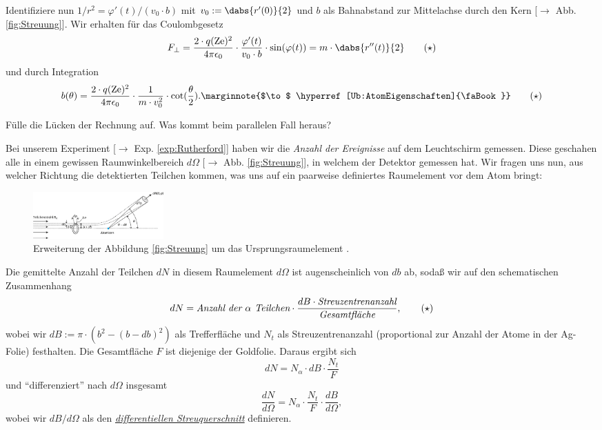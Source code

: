 \documentclass{subfiles}
\begin{document}
        Identifiziere nun $1/r^2=\varphi'(t)/(v_0\cdot b)$ mit $v_0:=\dabs{r'(0)}{2}$ und $b$ als Bahnabstand zur Mittelachse durch den Kern [$\to$ Abb. \ref{fig:Streuung}]. Wir erhalten für das Coulombgesetz 
        \begin{align*}
            F_\perp=\frac{2\cdot q(\text{Ze})^2}{4\pi\epsilon_0}\cdot\frac{\varphi'(t)}{v_0\cdot b}\cdot\sin(\varphi(t))=m\cdot\dabs{r''(t)}{2}
            \label{Ub:OrthKraftRutherford}\tag{$\star$}
        \end{align*}
        und durch Integration 
        \begin{align*}
            b(\theta)=\frac{2\cdot q(\text{Ze})^2}{4\pi\epsilon_0}\cdot\frac{1}{m\cdot v_0^2}\cdot\cot(\frac{\theta}{2}).
            \label{Ub:StreuungBahnabstand}\marginnote{$\to$ \hyperref[Ub:AtomEigenschaften]{\faBook}}\tag{$\star$}
        \end{align*}
        \begin{Aufgabe}
            \nr{} Fülle die Lücken der Rechnung auf. Was kommt beim parallelen Fall heraus?
        \end{Aufgabe}
        Bei unserem Experiment [$\to$ Exp. \ref{exp:Rutherford}] haben wir die \emph{Anzahl der Ereignisse} auf dem Leuchtschirm gemessen. Diese geschahen alle in einem gewissen Raumwinkelbereich $d\Omega$ [$\to$ Abb. \ref{fig:Streuung}], in welchem der Detektor gemessen hat. Wir fragen uns nun, aus welcher Richtung die detektierten Teilchen kommen, was uns auf ein paarweise definiertes Raumelement vor dem Atom bringt: 
        \begin{figure}
            \centering
            \includegraphics[width=5cm]{Bilddateien/physiko.21.45_9783110445671-fig_002.jpg}
            \caption[short]{Erweiterung der Abbildung \ref{fig:Streuung} um das Ursprungsraumelement \cite{degruyer:Streuung}.}
            \label{fig:StreuungRaumelemente}
        \end{figure}
        Die gemittelte Anzahl der Teilchen $dN$ in diesem Raumelement $d\Omega$ ist augenscheinlich von $db$ ab, sodaß wir auf den schematischen Zusammenhang 
        \begin{align*}
            dN = \emph{Anzahl der }\alpha\emph{ Teilchen}\cdot\frac{dB\cdot \emph{Streuzentrenanzahl}}{\emph{Gesamtfläche}},\label{Ub:dNRutherford}\tag{$\star$}
        \end{align*}
        wobei wir $dB:=\pi\cdot(b^2-(b-db)^2)$ als Trefferfläche und $N_t$ als Streuzentrenanzahl (proportional zur Anzahl der Atome in der Ag-Folie) festhalten. Die Gesamtfläche $F$ ist diejenige der Goldfolie. Daraus ergibt sich
        \[dN = N_\alpha \cdot dB \cdot\frac{N_t}{F}\]
        und \enquote{differenziert} nach $d\Omega$ insgesamt
        \[\frac{dN}{d\Omega} = N_\alpha \cdot\frac{N_t}{F}\cdot\frac{dB}{d\Omega},\]
        wobei wir $dB/d\Omega$ als den \href{https://de.wikipedia.org/wiki/Wirkungsquerschnitt}{\emph{differentiellen Streuquerschnitt}} definieren. 
\end{document}
